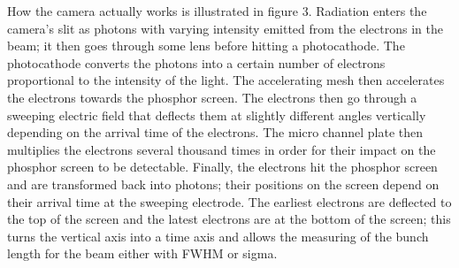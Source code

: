 \documentclass[%
 reprint,%
 amssymb, amsmath,%
 aip,cha,%
]{revtex4-1}
\begin{document}
How the camera actually works is illustrated in figure 3. Radiation enters the camera's slit as photons with varying intensity emitted from the electrons in the beam; it then goes through some lens before hitting a photocathode. The photocathode converts the photons into a certain number of electrons proportional to the intensity of the light. The accelerating mesh then accelerates the electrons towards the phosphor screen. The electrons then go through a sweeping electric field that deflects them at slightly different angles vertically depending on the arrival time of the electrons. The micro channel plate then multiplies the electrons several thousand times in order for their impact on the phosphor screen to be detectable. Finally, the electrons hit the phosphor screen and are transformed back into photons; their positions on the screen depend on their arrival time at the sweeping electrode. The earliest electrons are deflected to the top of the screen and the latest electrons are at the bottom of the screen; this turns the vertical axis into a time axis and allows the measuring of the bunch length for the beam either with FWHM or sigma.
\end{document}
